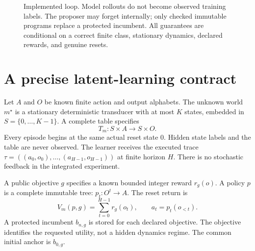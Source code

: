 \documentclass[10pt,twocolumn]{article}
\begin{document}
\begin{figure}[t]
\centering
{}
\caption{Implemented loop. Model rollouts do not become observed training labels.
The proposer may forget internally; only checked immutable programs replace a
protected incumbent. All guarantees are conditional on a correct finite class,
stationary dynamics, declared rewards, and genuine resets.}
\label{fig:loop}
\end{figure}

\section{A precise latent-learning contract}
Let $A$ and $O$ be known finite action and output alphabets. The unknown world
$m^\star$ is a stationary deterministic transducer with at most $K$ states,
embedded in $S=\{0,\ldots,K-1\}$. A complete table specifies
\begin{equation}
 T_m:S\times A\longrightarrow S\times O.
\end{equation}
Every episode begins at the same actual reset state $0$. Hidden state labels and
the table are never observed. The learner receives the executed trace
$\tau=((a_0,o_0),\ldots,(a_{H-1},o_{H-1}))$ at finite horizon $H$.
There is no stochastic feedback in the integrated experiment.

A public objective $g$ specifies a known bounded integer reward $r_g(o)$.
A policy $p$ is a complete immutable tree: $p_t:O^t\to A$.
The reset return is
\begin{equation}
 V_m(p,g)=\sum_{t=0}^{H-1}r_g(o_t),\qquad
 a_t=p_t(o_{<t}).\label{eq:value}
\end{equation}
A protected incumbent $b_{n,g}$ is stored for each declared objective. The
objective identifies the requested utility, not a hidden dynamics regime.
The common initial anchor is $b_{0,g}$.
\end{document}
